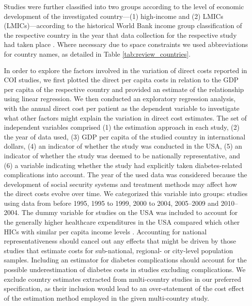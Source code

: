 Studies were further classified into two groups according to the level of economic development of the investigated country---(1) high-income and (2) \acp{LMIC} (\acp{LMIC})---according to the historical World Bank income group classification of the respective country in the year that data collection for the respective study had taken place \parencite{WorldBank}. Where necessary due to space constraints we used abbreviations for country names, as detailed in Table \ref{tab:review_countries}.

In order to explore the factors involved in the variation of direct costs reported in \ac{COI} studies, we first plotted the direct per capita costs in relation to the \ac{GDP} per capita of the respective country and provided an estimate of the relationship using linear regression. We then conducted an exploratory regression analysis, with the annual direct cost per patient as the dependent variable to investigate what other factors might explain the variation in direct cost estimates. The set of independent variables comprised (1) the estimation approach in each study, (2) the year of data used, (3) \ac{GDP} per capita of the studied country in international dollars, (4) an indicator of whether the study was conducted in the USA, (5) an indicator of whether the study was deemed to be nationally representative, and (6) a variable indicating whether the study had explicitly taken diabetes-related complications into account. The year of the used data was considered because the development of social security systems and treatment methods may affect how the direct costs evolve over time. We categorized this variable into groups: studies using data from before 1995, 1995 to 1999, 2000 to 2004, 2005--2009 and 2010--2004.  The dummy variable for studies on the USA was included to account for the generally higher healthcare expenditures in the USA compared which other \acp{HIC} with similar per capita income levels \parencite{Laugesen2011}. Accounting for national representativeness should cancel out any effects that might be driven by those studies that estimate costs for sub-national, regional- or city-level population samples. Including an estimator for diabetes complications should account for the possible underestimation of diabetes costs in studies excluding complications. We exclude country estimates extracted from multi-country studies in our preferred specification, as their inclusion would lead to an over-statement of the cost effect of the estimation method employed in the given multi-country study. 

